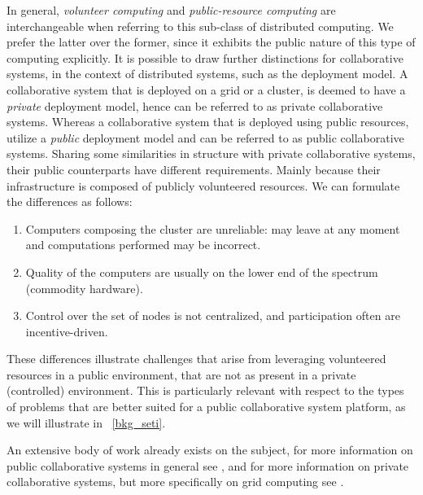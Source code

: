 \documentclass[12pt, titlepage]{uo_temp}
\begin{document}
     In general, \emph{volunteer computing} and \emph{public-resource computing} are
     interchangeable when referring to this sub-class of distributed computing. We prefer
     the latter over the former, since it exhibits the public nature of this type of
     computing explicitly.
     It is possible to draw further distinctions for collaborative systems, in the context
     of distributed systems, such as the deployment model. 
     A collaborative system that is deployed on a grid or a cluster, is deemed to have a
     \emph{private} deployment model, hence can be referred to as private collaborative systems.
     Whereas a collaborative system that is deployed using public resources, utilize a
     \emph{public} deployment model and can be referred to as public collaborative systems.
     Sharing some similarities in structure with private collaborative systems, their public
     counterparts have different requirements. Mainly because their infrastructure is
     composed of publicly volunteered resources. We can formulate the differences as follows:
     \begin{enumerate}
     \item Computers composing the cluster are unreliable: may leave at any moment and
       computations performed may be incorrect.
     \item Quality of the computers are usually on the lower end of the spectrum
       (commodity hardware).
     \item Control over the set of nodes is not centralized, and participation often
       are incentive-driven.
     \end{enumerate}
     These differences illustrate challenges that arise from leveraging volunteered
     resources in a public environment, that are not as present in a private
     (controlled) environment. This is particularly relevant with respect to the types of
     problems that are better suited for a public collaborative system platform, as we
     will illustrate in ~\ref{bkg_seti}.
     
     An extensive body of work already exists on the subject, for more information on
     public collaborative systems in general see \cite{anderson2003public}
     \cite{anderson2006computational}, and for more information on private collaborative
     systems, but more specifically on grid computing see \cite{berman2003grid}.
     
\end{document}
